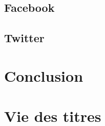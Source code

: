 \documentclass[a4paper,10pt]{article}
\begin{document}
\subsection{Facebook}
\subsection{Twitter}

\section{Conclusion}

\section{Vie des titres}


\clearpage
\end{document}
